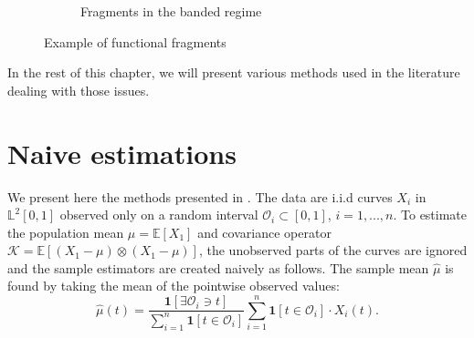 \documentclass[10pt, a4paper]{report}
\newcommand{\E}[0]{\mathbb{E}}
\newcommand{\Ll}[0]{\mathbb{L}}
\theoremstyle{definition}
\theoremstyle{remark}
\begin{document}
\begin{figure}[ht]
\begin{subfigure}{.3\textwidth}
		\caption{\centering Fragments in the banded regime}
	\end{subfigure}
	\caption{Example of functional fragments}
	\label{fig:exfrags}
\end{figure}

In the rest of this chapter, we will present various methods used in the literature dealing with those issues. 	

\section{Naive estimations}\label{naiveest}
We present here the methods presented in \cite{Kraus1}. The data are i.i.d curves $X_i$ in $\Ll^2[0,1]$ observed only on a random interval $\mathcal{O}_i \subset [0,1]$, $i=1,...,n$. To estimate the population mean $\mu = \E[X_1]$ and covariance operator $\mathcal{K} = \E[(X_1-\mu) \otimes (X_1-\mu)]$, the unobserved parts of the curves are ignored and the sample estimators are created naively as follows. The sample mean $\hat{\mu}$ is found by taking the mean of the pointwise observed values: 
\begin{equation}\label{estmufrag}
	\hat{\mu}(t) = \frac{\mathbf{1}[\exists \mathcal{O}_i \ni t ]}{\sum_{i=1}^n \mathbf{1}[t \in \mathcal{O}_i]} \sum_{i=1}^n \mathbf{1}[t \in \mathcal{O}_i] \cdot X_i(t).
\end{equation}
\end{document}
